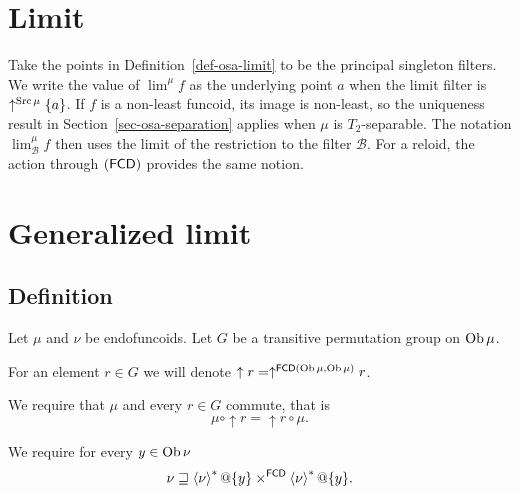 \section{Limit}
Take the points in Definition~\ref{def-osa-limit} to be the principal
singleton filters. We write the value of $\lim^\mu f$ as the
underlying point $a$ when the limit filter is $\uparrow^{\operatorname{Src}\mu}\{a\}$.
If $f$ is a non-least funcoid, its image is non-least, so the
uniqueness result in Section~\ref{sec-osa-separation} applies when
$\mu$ is $T_2$-separable. The notation $\lim_{\mathcal B}^\mu f$
then uses the limit of the restriction to the filter $\mathcal B$.
For a reloid, the action through $(\mathsf{FCD})$ provides the same notion.

\section{Generalized limit}

\subsection{Definition}

Let $\mu$ and $\nu$ be endofuncoids. Let $G$ be a transitive permutation
group on $\operatorname{Ob}\mu$.

For an element $r\in G$ we will denote $\uparrow r=\uparrow^{\mathsf{FCD}(\operatorname{Ob}\mu,\operatorname{Ob}\mu)}r$.

We require that $\mu$ and every $r\in G$ commute, that is
\[
\mu\circ\uparrow r=\uparrow r\circ\mu.
\]


We require for every $y\in\operatorname{Ob}\nu$ 
\begin{equation}
\nu\sqsupseteq\left\langle \nu\right\rangle ^{\ast}@\{y\}\times^{\mathsf{FCD}}\left\langle \nu\right\rangle ^{\ast}@\{y\}.\label{lim-squares}
\end{equation}

